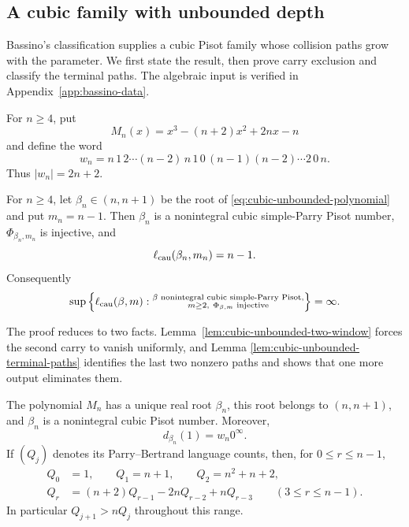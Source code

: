 \subsection{A cubic family with unbounded depth}

Bassino's classification \cite{Bassino2002} supplies a cubic Pisot family
whose collision paths grow with the parameter.  We first state the result,
then prove carry exclusion and classify the terminal paths.  The algebraic
input is verified in Appendix~\ref{app:bassino-data}.

For $n\ge4$, put
\begin{equation}
M_n(x)=x^3-(n+2)x^2+2nx-n
\label{eq:cubic-unbounded-polynomial}
\end{equation}
and define the word
\begin{equation}
w_n=n\,1\,2\cdots(n-2)\,n\,1\,0\,
(n-1)(n-2)\cdots2\,0\,n.
\label{eq:cubic-unbounded-parry-word}
\end{equation}
Thus $|w_n|=2n+2$.

\begin{theorem}
\label{thm:cubic-unbounded-causal-depth}
For $n\ge4$, let $\beta_n\in(n,n+1)$ be the root of
\eqref{eq:cubic-unbounded-polynomial} and put $m_n=n-1$.  Then $\beta_n$
is a nonintegral cubic simple-Parry Pisot number, $\Phi_{\beta_n,m_n}$ is
injective, and
\begin{equation}
\ell_{\rm cau}(\beta_n,m_n)=n-1.
\label{eq:cubic-unbounded-causal-length}
\end{equation}
Consequently
\[
\sup\left\{\ell_{\rm cau}(\beta,m):
\substack{\beta\text{ nonintegral cubic simple-Parry Pisot},\\
m\ge2,\ \Phi_{\beta,m}\text{ injective}}\right\}=\infty.
\]
\end{theorem}

The proof reduces to two facts.  Lemma~\ref{lem:cubic-unbounded-two-window}
forces the second carry to vanish uniformly, and Lemma
\ref{lem:cubic-unbounded-terminal-paths} identifies the last two nonzero
paths and shows that one more output eliminates them.

\begin{lemma}
\label{lem:cubic-unbounded-family-data}
The polynomial $M_n$ has a unique real root $\beta_n$, this root belongs to
$(n,n+1)$, and $\beta_n$ is a nonintegral cubic Pisot number.  Moreover,
\[
d_{\beta_n}(1)=w_n0^\infty.
\]
If $(Q_j)$ denotes its Parry--Bertrand language counts, then, for
$0\le r\le n-1$,
\begin{align}
Q_0&=1,\qquad Q_1=n+1,\qquad Q_2=n^2+n+2,
\label{eq:cubic-unbounded-initial-Q}\\
Q_r&=(n+2)Q_{r-1}-2nQ_{r-2}+nQ_{r-3}
\qquad(3\le r\le n-1).
\label{eq:cubic-unbounded-Q-recurrence}
\end{align}
In particular $Q_{j+1}>nQ_j$ throughout this range.
\end{lemma}

